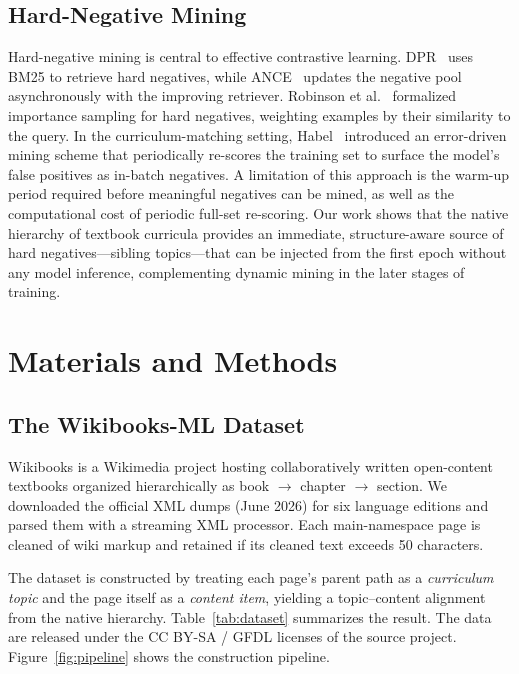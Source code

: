 \documentclass[applsci,article,submit,pdftex,moreauthors]{Definitions/mdpi}
\begin{document}
\subsection{Hard-Negative Mining}

Hard-negative mining is central to effective contrastive learning. DPR~\cite{karpukhin2020dpr} uses BM25 to retrieve hard negatives, while ANCE~\cite{xiong2020ance} updates the negative pool asynchronously with the improving retriever. Robinson et al.~\cite{robinson2021hard} formalized importance sampling for hard negatives, weighting examples by their similarity to the query. In the curriculum-matching setting, Habel~\cite{habel2023} introduced an error-driven mining scheme that periodically re-scores the training set to surface the model's false positives as in-batch negatives. A limitation of this approach is the warm-up period required before meaningful negatives can be mined, as well as the computational cost of periodic full-set re-scoring. Our work shows that the native hierarchy of textbook curricula provides an immediate, structure-aware source of hard negatives---sibling topics---that can be injected from the first epoch without any model inference, complementing dynamic mining in the later stages of training.

\section{Materials and Methods}\label{sec:method}

\subsection{The Wikibooks-ML Dataset}

Wikibooks is a Wikimedia project hosting collaboratively written open-content textbooks organized hierarchically as book $\rightarrow$ chapter $\rightarrow$ section. We downloaded the official XML dumps (June 2026) for six language editions and parsed them with a streaming XML processor. Each main-namespace page is cleaned of wiki markup and retained if its cleaned text exceeds 50 characters.

The dataset is constructed by treating each page's parent path as a \emph{curriculum topic} and the page itself as a \emph{content item}, yielding a topic--content alignment from the native hierarchy. Table~\ref{tab:dataset} summarizes the result. The data are released under the CC BY-SA / GFDL licenses of the source project. Figure~\ref{fig:pipeline} shows the construction pipeline.
\end{document}

